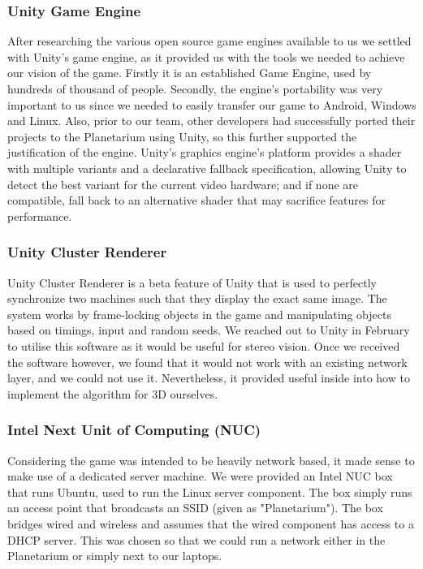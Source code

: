 \documentclass[11pt,a4paper]{article}
\begin{document}
 \subsubsection{  Unity Game Engine}

 After researching the various open source game engines available to us we settled with Unity’s game engine, as it provided us with the tools we needed to achieve our vision of the game. Firstly it is an established Game Engine, used by hundreds of thousand of people. Secondly, the engine's portability was very important to us since we needed to easily transfer our game to Android, Windows and Linux. Also, prior to our team, other developers had successfully ported their projects to the Planetarium using Unity, so this further supported the justification of the engine. Unity's graphics engine's platform provides a shader with multiple variants and a declarative fallback specification, allowing Unity to detect the best variant for the current video hardware; and if none are compatible, fall back to an alternative shader that may sacrifice features for performance.

 \subsubsection{ Unity Cluster Renderer}
Unity Cluster Renderer is a beta feature of Unity that is used to perfectly synchronize two machines such that they display the exact same image. The system works by frame-locking objects in the game and manipulating objects based on timings, input and random seeds. We reached out to Unity in February to utilise this software as it would be useful for stereo vision. Once we received the software however, we found that it would not work with an existing network layer, and we could not use it. Nevertheless, it provided useful inside into how to implement the algorithm for 3D ourselves.

 \subsubsection{ Intel Next Unit of Computing (NUC)}
Considering the game was intended to be heavily network based, it made sense to make use of a dedicated server machine. We were provided an Intel NUC box that runs Ubuntu, used to run the Linux server component. The box simply runs an access point that broadcasts an SSID (given as "Planetarium"). The box bridges wired and wireless and assumes that the wired component has access to a DHCP server. This was chosen so that we could run a network either in the Planetarium or simply next to our laptops.
\end{document}
